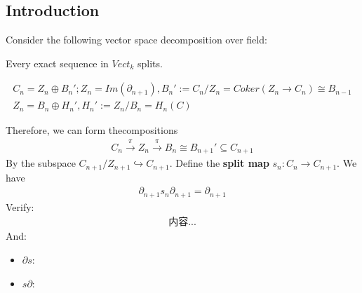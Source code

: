 \documentclass[Total.tex]{subfiles}
\begin{document}
			\subsection{Introduction}
				Consider the following vector space decomposition over field:
				\begin{lemma}
					Every exact sequence in $Vect_k$ splits.
				\end{lemma}
				\begin{gather*}
					C_n=Z_n\oplus B_n';Z_n=Im(\partial_{n+1}),B_n':=C_n/Z_n=Coker(Z_n\rightarrow C_n)\cong B_{n-1}\\
					Z_n=B_n\oplus H_n',H_n':=Z_n/B_n=H_n(C)
				\end{gather*}
				\begin{center}
					{\tiny {}}
				\end{center}
				Therefore, we can form thecompositions
				\begin{gather*}
					C_n\stackrel{\pi}{\rightarrow}Z_n\stackrel{\pi}{\rightarrow} B_{n}\cong B_{n+1}'\subseteq C_{n+1}
				\end{gather*}
				By the subspace $C_{n+1}/Z_{n+1}\hookrightarrow C_{n+1}$. Define the \textbf{split map} $s_n:C_n\rightarrow C_{n+1}$. We have
				\begin{gather*}
					\partial_{n+1}s_n\partial_{n+1}=\partial_{n+1}
				\end{gather*}
				Verify:
				\begin{gather*}
					内容...
				\end{gather*}
				And:
				\begin{itemize}
					\item $\partial s$:
					\item $s\partial$:
				\end{itemize}
\end{document}
